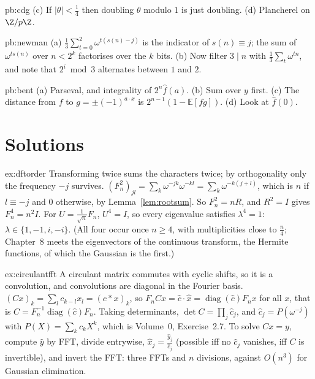 \begin{hint}{pb:cdg}
(c) If $|\theta|<\frac14$ then doubling $\theta$ modulo $1$ is just doubling. (d) Plancherel on $\Z/p\Z$.
\end{hint}

\begin{hint}{pb:newman}
(a) $\frac13\sum_{t=0}^2\omega^{t(s(n)-j)}$ is the indicator of $s(n)\equiv j$; the sum of $\omega^{ts(n)}$ over $n<2^k$ factorises over the $k$ bits.
(b) Now filter $3\mid n$ with $\frac13\sum_t\omega^{tn}$, and note that $2^i\bmod3$ alternates between $1$ and $2$.
\end{hint}

\begin{hint}{pb:bent}
(a) Parseval, and integrality of $2^n\hat f(a)$. (b) Sum over $y$ first. (c) The distance from $f$ to $g=\pm(-1)^{a\cdot x}$ is
$2^{n-1}(1-\mathbb E[fg])$. (d) Look at $\hat f(0)$.
\end{hint}

\section{Solutions}

\begin{solution}{ex:dftorder}
\idea Transforming twice sums the characters twice; by orthogonality only the frequency $-j$ survives.
\writeup $(F_n^2)_{jl}=\sum_k\omega^{-jk}\omega^{-kl}=\sum_k\omega^{-k(j+l)}$, which is $n$ if $l\equiv-j$ and $0$ otherwise, by Lemma~\ref{lem:rootsum}. So $F_n^2=nR$, and
$R^2=I$ gives $F_n^4=n^2I$. For $U=\frac1{\sqrt n}F_n$, $U^4=I$, so every eigenvalue satisfies $\lambda^4=1$: $\lambda\in\{1,-1,i,-i\}$. (All four occur once
$n\ge4$, with multiplicities close to $\frac n4$; Chapter~8 meets the eigenvectors of the continuous transform, the Hermite
functions, of which the Gaussian is the first.)
\end{solution}

\begin{solution}{ex:circulantfft}
\idea A circulant matrix commutes with cyclic shifts, so it is a convolution, and convolutions are diagonal in the Fourier
basis.
\writeup $(Cx)_k=\sum_lc_{k-l}x_l=(c*x)_k$, so $F_nCx=\hat c\cdot\hat x=\operatorname{diag}(\hat c)F_nx$ for all $x$, that is $C=F_n^{-1}\operatorname{diag}(\hat c)F_n$. Taking
determinants, $\det C=\prod_j\hat c_j$, and $\hat c_j=P(\omega^{-j})$ with $P(X)=\sum_kc_kX^k$, which is Volume~0, Exercise~2.7. To solve $Cx=y$, compute $\hat y$ by
FFT, divide entrywise, $\hat x_j=\frac{\hat y_j}{\hat c_j}$ (possible iff no $\hat c_j$ vanishes, iff $C$ is invertible), and invert the FFT: three FFTs and $n$
divisions, against $O(n^3)$ for Gaussian elimination.
\end{solution}

